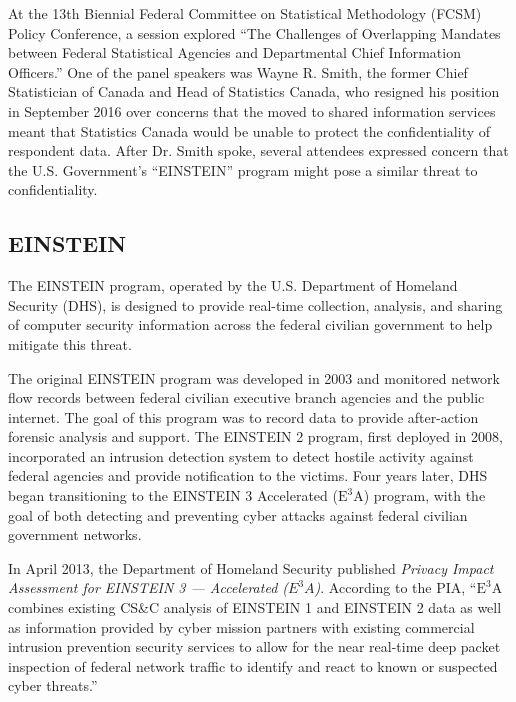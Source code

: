 \documentclass[fleqn,10pt]{wlscirep}
\newcommand{\ETA}{$\textrm{E}^\textrm{3}\textrm{A}$\xspace}
\begin{document}
At the 13th Biennial Federal Committee on Statistical Methodology
(FCSM) Policy Conference, a session explored ``The Challenges of
Overlapping Mandates between Federal Statistical Agencies and
Departmental Chief Information Officers.''\cite{fcsm-program} One of
the panel speakers was Wayne R. Smith, the former Chief Statistician
of Canada and Head of Statistics Canada, who resigned his position in
September 2016 over concerns that the moved to shared information services
meant that Statistics Canada would be unable to
protect the confidentiality of respondent
data\cite{ottawacitizen}. After Dr. Smith spoke, several attendees
expressed concern that the U.S. Government's ``EINSTEIN'' program
might pose a similar threat to confidentiality. 

\subsection{EINSTEIN}

The EINSTEIN program, operated by the U.S. Department of Homeland
Security (DHS), is designed to provide real-time collection,
analysis, and sharing of computer security information across the
federal civilian government to help mitigate this
threat.\cite{dhs-einstein-2004}

The original EINSTEIN program was developed in 2003 and monitored
network flow records between federal civilian executive branch
agencies and the public internet. The goal of this program was to
record data to provide after-action forensic analysis and support. The
EINSTEIN 2 program, first deployed in 2008, incorporated an intrusion
detection system to detect hostile activity against federal agencies
and provide notification to the victims. Four years later, DHS began
transitioning to the EINSTEIN 3 Accelerated (\ETA) program, with the
goal of both detecting and preventing cyber attacks against federal
civilian government networks.\cite{dhs-einstein}

In April 2013, the Department of Homeland Security published 
\emph{Privacy Impact Assessment for EINSTEIN 3 --- Accelerated
  ($E^3A$)}\cite{dhs-e3a-pia}. According to the PIA, ``\ETA combines
existing CS\&C analysis of EINSTEIN 1 and EINSTEIN 2 data as well as
information provided by cyber mission partners with existing
commercial intrusion prevention security services to allow for the
near real-time deep packet inspection of federal network traffic to
identify and react to known or suspected cyber threats.''\cite[p.4]{dhs-e3a-pia}
\end{document}

